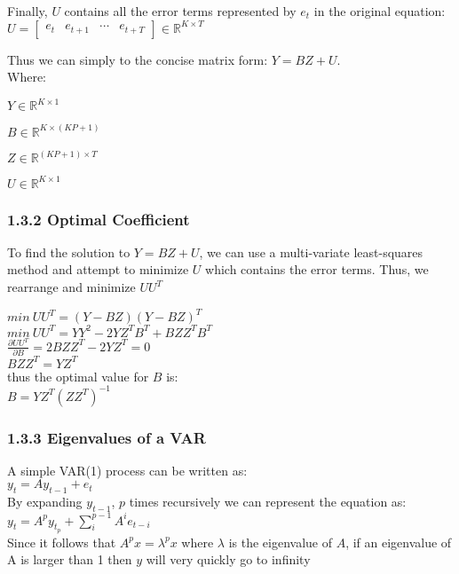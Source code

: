 \documentclass[11pt]{article}
\begin{document}
Finally, \(U\) contains all the error terms represented by \(e_t\) in
the original equation:\\
\(U = \begin{bmatrix} e_t & e_{t+1} & \cdots & e_{t+T} \end{bmatrix} \in \mathbb{R}^{K\times T}\)

Thus we can simply to the concise matrix form: \(Y = BZ + U\).\\
Where:

\(Y \in \mathbb{R}^{K\times 1}\)

\(B \in \mathbb{R}^{K \times (KP + 1)}\)

\(Z \in \mathbb{R}^{(KP + 1) \times T}\)

\(U \in \mathbb{R}^{K\times 1}\)

    \hypertarget{optimal-coefficient}{%
\subsubsection{1.3.2 Optimal Coefficient}\label{optimal-coefficient}}

To find the solution to \(Y = BZ + U\), we can use a multi-variate
least-squares method and attempt to minimize \(U\) which contains the error
terms. Thus, we rearrange and minimize \(UU^T\)

\(min\:UU^T = (Y-BZ)(Y-BZ)^T\)\\
\(min\:UU^T = YY^2 - 2YZ^TB^T + BZZ^TB^T\)\\
\(\frac{\partial UU^T}{\partial B} = 2BZZ^T - 2YZ^T = 0\)\\
$ BZZ^T = YZ^T $\\
thus the optimal value for \(B\) is:\\
\(B = YZ^T(ZZ^T)^{-1}\)

    \hypertarget{eigenvalues-of-a-var}{%
\subsubsection{1.3.3 Eigenvalues of a VAR}\label{eigenvalues-of-a-var}}

A simple VAR(1) process can be written as:\\
\(y_t = Ay_{t-1} + e_t\)\\
By expanding \(y_{t-1}\), \(p\) times recursively we can represent the
equation as:\\
\(y_t = A^py_{t_p} + \sum_i^{p-1}A^ie_{t-i}\)\\
Since it follows that \(A^px = \lambda^px\) where \(\lambda\) is the
eigenvalue of \(A\), if an eigenvalue of A is larger than 1 then \(y\)
will very quickly go to infinity
\end{document}
